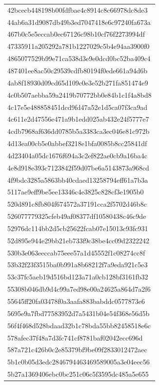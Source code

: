 \begin{tabular}{l}
42bcecb448198b00fdfbae4c8914c8c66978dc8de3 \\
44ab6a31d9087db49b3ed7047418e6c97240fa673a \\
467b0c5e5eccab0ec67126c98b10cf76f2273994df \\
47335911a205292a781b1227029c5b4e94aa3900f0 \\
4865077529b99e71ca538d3e9e0dcd0bc52ba409c4 \\
487401ee8ac50c29539cdfb80194f0ede661a94d6b \\
4ab8f18930d09cd65d109c0e3e52b271fa851474e9 \\
4c0b507aebba59a2419b70772bb0e84b1c1f4a8bd8 \\
4c17e5e488858451dcd9fd47a52e1d5ca07f3ca9ad \\
4c611e2d47556e471a9b1edd025ab432e24f5777e7 \\
4cdb7968af636dd0785b5a3383ca3ec046e81c972b \\
4d13ea00cb5e0abbef3218e1bfa0085b8cc25841df \\
4d23404a05dc1676f694a3c2ef822ae0cb9a16ba4c \\
4e8d918e393c7123842f59d07be6a5143873a968cd \\
4f9bdc3285a5863bb40cdaed13258794eff61a7b3a \\
5117ae9eff9be5ee13346c4e3825c828cf3e1905b0 \\
520d891c8fb804f674572a37191cca2f5702d46b8c \\
526077779325cfeb49af08377df10580438c46c9de \\
52976dc114bb2d5cb25622fcab07e15013c93fc931 \\
52d895e944e29bb21eb733f9c38be4cc09d2322242 \\
530b3e063eeccab75eee57a1d45552f1c08274cc8f \\
53b32f23f3515ba0b991a8b68212f7a9eda921c5e3 \\
53c37fc5aeb19d516bd123a71a0cb128bf3161fb32 \\
55308b046db9d4c99a7ed98e00a24625a864d7a2f6 \\
55645ff20fa03478f0a3aafa883babddc0577873e6 \\
5695e9a7fbd77583952d7a5431b04e54f368e56d5b \\
56f4f468d528bdaad32b1c78bda55bb82458518e6c \\
578afec37f48a7d3fc741cf8781baf02042ecc696d \\
587a721c426b0c2e85379bf9be09f2833012472aec \\
5b1c0b05d3edc2846794463469589005a3e04eec56 \\
5b27a1369406ebc0bc251c06c5f3595dc485a5e655 \\

\end{tabular}
